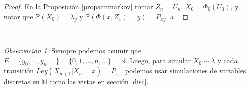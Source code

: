 \documentclass[letterpaper,11pt]{article} %
\theoremstyle{defbreak}
\theoremstyle{propbreak}
\theoremstyle{remark}
\newtheorem{remark}{Observación}[subsection]
\theoremstyle{break}
\def\P{\mathbb{P}}
\def\N{\mathbb{N}}
\def\gris{\color{mygray}}
\def\negro{\color{black}}
\def\findem{\null\hfill\color{white}a\color{black}_\square}
\begin{document}
\begin{proof}
\gris
En la Proposición \ref{propsimmarkov} tomar $Z_n=U_n$, $X_0=\Phi_0(U_0)$, y notar que $\P(X_0)=\lambda_y$ y $\P(\Phi(x,Z_1)=y)=P_{xy}.$ \findem
\negro
\end{proof}
\vspace{.5cm} \\
\begin{remark}
Siempre podemos asumir que $E=\{y_0,\dots,y_n,\dots\} = \{0,1,\dots,n,\dots\}=\N$.
\newline Luego, para simular $X_0\sim\lambda$ y cada transición $Ley(X_{n+1}|X_n=x)=P_{x_0}$, podemos usar simulaciones de variables discretas en $\N$ como las vistas en sección \ref{disc}.
\end{remark}
\vspace{1.5cm}\\
\end{document}
